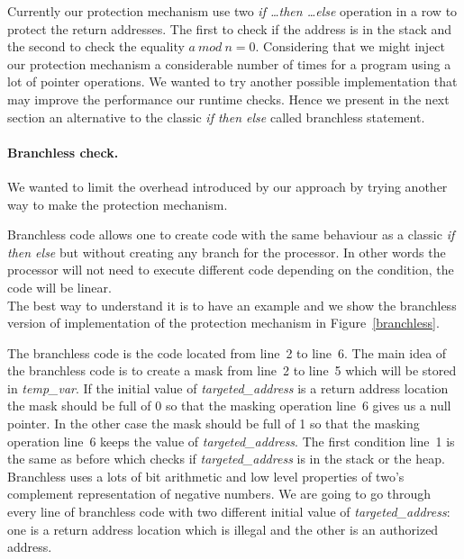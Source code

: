 \documentclass[11pt]{sdm}
\begin{document}
Currently our protection mechanism use two \textit{if \dots then \dots else} operation in a row to protect the return addresses. The first to check if the address is in the stack and the second to check the equality $a~mod~n=0$.
Considering that we might inject our protection mechanism a considerable number of times for a program using a lot of pointer operations. We wanted to try another possible implementation that may improve the performance our runtime checks.
Hence we present in the next section an alternative to the classic \textit{if then else} called branchless statement.

\paragraph{Branchless check.}
\label{par:Branchless check}

We wanted to limit the overhead introduced by our approach by trying another way to make the protection mechanism. 

Branchless code allows one to create code with the same behaviour as a classic \textit{if then else} but without creating any branch for the processor. In other words the processor will not need to execute different code depending on the condition, the code will be linear.\\
The best way to understand it is to have an example and we show the branchless version of implementation of the protection mechanism in Figure~\ref{branchless}.

The branchless code is the code located from line~2 to line~6.
The main idea of the branchless code is to create a mask from line~2 to line~5 which will be stored in \textit{temp\_var}. If the initial value of \textit{targeted\_address} is a return address location the mask should be full of 0 so that the masking operation line~6 gives us a null pointer. In the other case the mask should be full of 1 so that the masking operation line~6 keeps the value of \textit{targeted\_address}.
The first condition line~1 is the same as before which checks if \textit{targeted\_address} is in the stack or the heap.
Branchless uses a lots of bit arithmetic and low level properties of two's complement representation of negative numbers. We are going to go through every line of branchless code with two different initial value of \textit{targeted\_address}: one is a return address location which is illegal and the other is an authorized address.
\end{document}
